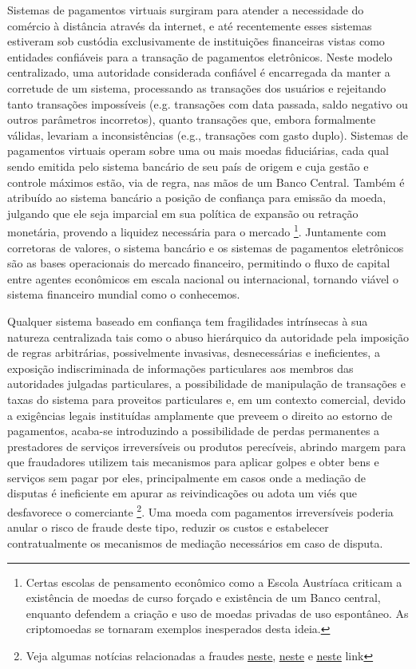 \documentclass[a4paper,11pt]{article}
\newcommand{\link}[2]{{\color{blue}\underline{\href{#1}{#2}}}}
\begin{document}
Sistemas de pagamentos virtuais surgiram para atender a necessidade do comércio à distância através da internet, e até recentemente esses sistemas estiveram sob custódia exclusivamente de instituições financeiras vistas como entidades confiáveis para a transação de pagamentos eletrônicos.
Neste modelo centralizado, uma autoridade considerada confiável é encarregada da manter a corretude de um sistema, processando as transações dos usuários e rejeitando tanto transações impossíveis (e.g. transações com data passada, saldo negativo ou outros parâmetros incorretos), quanto transações que, embora formalmente válidas, levariam a inconsistências (e.g., transações com gasto duplo).
Sistemas de pagamentos virtuais operam sobre uma ou mais moedas fiduciárias, cada qual sendo emitida pelo sistema bancário de seu país de origem e cuja gestão e controle máximos estão, via de regra, nas mãos de um Banco Central.
Também é atribuído ao sistema bancário a posição de confiança para emissão da moeda, julgando que ele seja imparcial em sua política de expansão ou retração monetária, provendo a liquidez necessária para o mercado
\footnote{Certas escolas de pensamento econômico como a Escola Austríaca \cite{Mises1960, Rothbard2013} criticam a existência de moedas de curso forçado e existência de um Banco central, enquanto defendem a criação e uso de moedas privadas de uso espontâneo. As criptomoedas se tornaram exemplos inesperados desta ideia.}.
Juntamente com corretoras de valores, o sistema bancário e os sistemas de pagamentos eletrônicos são as bases operacionais do mercado financeiro, permitindo o fluxo de capital entre agentes econômicos em escala nacional ou internacional, tornando viável o sistema financeiro mundial como o conhecemos.

Qualquer sistema baseado em confiança tem fragilidades intrínsecas à sua natureza centralizada tais como o abuso hierárquico da autoridade pela imposição de regras arbitrárias, possivelmente invasivas, desnecessárias e ineficientes, a exposição indiscriminada de informações particulares aos membros das autoridades julgadas particulares, a possibilidade de manipulação de transações e taxas do sistema para proveitos particulares e, em um contexto comercial, devido a exigências legais instituídas amplamente que preveem o direito ao estorno de pagamentos, acaba-se introduzindo a possibilidade de perdas permanentes a prestadores de serviços irreversíveis ou produtos perecíveis, abrindo margem para que fraudadores utilizem tais mecanismos para aplicar golpes e obter bens e serviços sem pagar por eles, principalmente em casos onde a mediação de disputas é ineficiente em apurar as reivindicações ou adota um viés que desfavorece o comerciante
\footnote{Veja algumas notícias relacionadas a fraudes \link{https://canaltech.com.br/e-commerce/golpe-pedra-mercado-livre-115288/}{neste}, \link{https://www.techtudo.com.br/noticias/2019/07/golpe-da-compra-falsa-faz-vitimas-no-mercado-livre-veja-como-evitar.ghtml}{neste} e \link{https://www.coindesk.com/how-fraud-sunk-bitcoin-exchange}{neste} link}.
Uma moeda com pagamentos irreversíveis poderia anular o risco de fraude deste tipo, reduzir os custos e estabelecer contratualmente os mecanismos de mediação necessários em caso de disputa.
\end{document}
